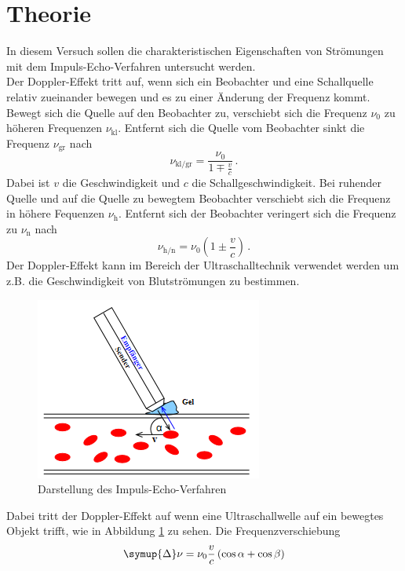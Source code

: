 \section{Theorie}
\label{sec:Theorie}
In diesem Versuch sollen die charakteristischen Eigenschaften von Strömungen mit dem Impuls-Echo-Verfahren untersucht werden.\\
Der Doppler-Effekt tritt auf, wenn sich ein Beobachter und eine Schallquelle relativ zueinander bewegen und es zu einer Änderung der Frequenz kommt.
Bewegt sich die Quelle auf den Beobachter zu, verschiebt sich die Frequenz $\nu_0$ zu höheren Frequenzen $\nu_\text{kl}$. Entfernt sich die Quelle vom Beobachter sinkt die Frequenz $\nu_\text{gr}$ nach
\begin{equation}
    \nu_\text{kl/gr}=\frac{\nu_0}{1\mp \frac{v}{c}} \, .
\end{equation}
Dabei ist $v$ die Geschwindigkeit und $c$ die Schallgeschwindigkeit.
Bei ruhender Quelle und auf die Quelle zu bewegtem Beobachter verschiebt sich die Frequenz in höhere Fequenzen $\nu_\text{h}$.
Entfernt sich der Beobachter veringert sich die Frequenz zu $\nu_\text{n}$ nach 
\begin{equation}
    \nu_\text{h/n}= \nu_0 \left(1 \pm \frac{v}{c}\right) \, .
\end{equation}
Der Doppler-Effekt kann im Bereich der Ultraschalltechnik verwendet werden um z.B. die Geschwindigkeit von Blutströmungen zu bestimmen. 
\begin{figure}
    \centering
    \includegraphics[scale=0.4]{pics/Blut.png}
    \caption{Darstellung des Impuls-Echo-Verfahren \cite{}}
    \label{fig:IEV}
  \end{figure}
Dabei tritt der Doppler-Effekt auf wenn eine Ultraschallwelle auf ein bewegtes Objekt trifft, wie in Abbildung \ref{fig:IEV} zu sehen. Die Frequenzverschiebung 
\begin{equation}
    \symup{\Delta}\nu=\nu_0 \frac{v}{c}\left(\cos \alpha + \cos \beta \right)
\end{equation}
